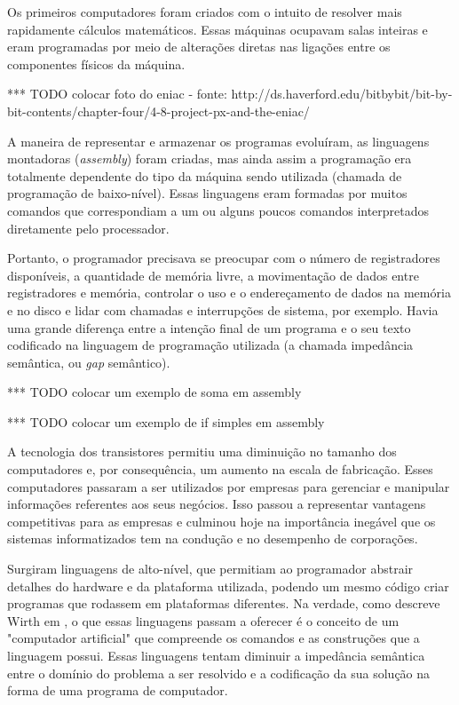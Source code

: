 \documentclass[11pt,twoside,a4paper]{book}
\begin{document}
Os primeiros computadores foram criados com o intuito de resolver mais rapidamente cálculos matemáticos. Essas máquinas ocupavam salas inteiras e eram programadas por meio de alterações diretas nas ligações entre os componentes físicos da máquina. 

*** TODO colocar foto do eniac - fonte: http://ds.haverford.edu/bitbybit/bit-by-bit-contents/chapter-four/4-8-project-px-and-the-eniac/

A maneira de representar e armazenar os programas evoluíram, as linguagens montadoras (\emph{assembly}) foram criadas, mas ainda assim a programação era totalmente dependente do tipo da máquina sendo utilizada (chamada de programação de baixo-nível). Essas linguagens eram formadas por muitos comandos que correspondiam a um ou alguns poucos comandos interpretados diretamente pelo processador. 

Portanto, o programador precisava se preocupar com o número de registradores disponíveis, a quantidade de memória livre, a movimentação de dados entre registradores e memória, controlar o uso e o endereçamento de dados na memória e no disco e lidar com chamadas e interrupções de sistema, por exemplo. Havia uma grande diferença entre a intenção final de um programa e o seu texto codificado na linguagem de programação utilizada (a chamada impedância semântica, ou \emph{gap} semântico).

*** TODO colocar um exemplo de soma em assembly

*** TODO colocar um exemplo de if simples em assembly

A tecnologia dos transistores permitiu uma diminuição no tamanho dos computadores e, por consequência, um aumento na escala de fabricação. Esses computadores passaram a ser utilizados por empresas para gerenciar e manipular informações referentes aos seus negócios. Isso passou a representar vantagens competitivas para as empresas e culminou hoje na importância inegável que os sistemas informatizados tem na condução e no desempenho de corporações.

Surgiram linguagens de alto-nível, que permitiam ao programador abstrair detalhes do hardware e da plataforma utilizada, podendo um mesmo código criar programas que rodassem em plataformas diferentes. Na verdade, como descreve Wirth em \cite{alg_ds}, o que essas linguagens passam a oferecer é o conceito de um "computador artificial" que compreende os comandos e as construções que a linguagem possui. Essas linguagens tentam diminuir a impedância semântica entre o domínio do problema a ser resolvido e a codificação da sua solução na forma de uma programa de computador.
\end{document}
